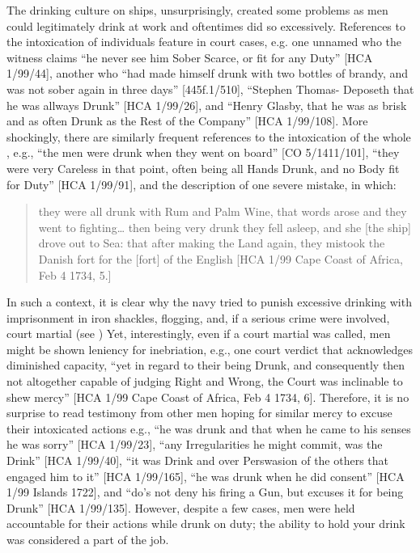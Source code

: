 The drinking culture on ships, unsurprisingly, created some problems as men could legitimately drink at work and oftentimes did so excessively. References to the intoxication of individuals feature in court cases, e.g. one unnamed  who the witness claims “he never see him Sober Scarce, or fit for any Duty” [HCA 1/99/44], another who “had made himself drunk with two bottles of brandy, and was not sober again in three days” [445f.1/510], “Stephen Thomas- Deposeth that he was allways Drunk” [HCA 1/99/26], and “Henry Glasby, that he was as brisk and as often Drunk as the Rest of the Company” [HCA 1/99/108]. More shockingly, there are similarly frequent references to the intoxication of the whole , e.g., “the men were drunk when they went on board” [CO 5/1411/101], “they were very Careless in that point, often being all Hands Drunk, and no Body fit for Duty” [HCA 1/99/91], and the description of one severe mistake, in which: 

\begin{quotation}
they were all drunk with Rum and Palm Wine, that words arose and they went to fighting… then being very drunk they fell asleep, and she [the ship] drove out to Sea: that after making the Land again, they mistook the Danish fort for the [fort] of the English [HCA 1/99 Cape Coast of Africa, Feb 4 1734, 5.]
\end{quotation}

In such a context, it is clear why the navy tried to punish excessive drinking with imprisonment in iron shackles, flogging, and, if a serious crime were involved, court martial (see ) Yet, interestingly, even if a court martial was called, men might be shown leniency for inebriation, e.g., one court verdict that acknowledges diminished capacity, “yet in regard to their being Drunk, and consequently then not altogether capable of judging Right and Wrong, the Court was inclinable to shew mercy” [HCA 1/99 Cape Coast of Africa, Feb 4 1734, 6]. Therefore, it is no surprise to read testimony from other men hoping for similar mercy to excuse their intoxicated actions e.g., “he was drunk and that when he came to his senses he was sorry” [HCA 1/99/23], “any Irregularities he might commit, was the Drink” [HCA 1/99/40], “it was Drink and over Perswasion of the others that engaged him to it” [HCA 1/99/165], “he was drunk when he did consent” [HCA 1/99  Islands 1722], and “do’s not deny his firing a Gun, but excuses it for being Drunk” [HCA 1/99/135]. However, despite a few cases, men were held accountable for their actions while drunk on duty; the ability to hold your drink was considered a part of the job. 

